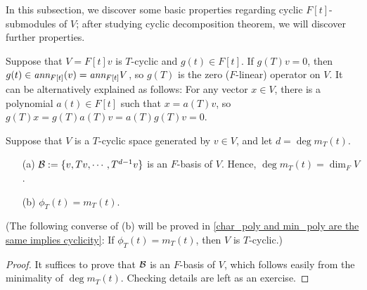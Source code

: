 In this subsection, we discover some basic properties regarding cyclic $F[t]$-submodules of $V$; after studying cyclic decomposition theorem, we will discover further properties.
\begin{exmp}
    Suppose that $V=F[t]v$ is $T$-cyclic and $g(t)\in F[t]$.
    If $g(T)v=0$, then $g(t)\in\textit{ann}_{F[t]}(v)=\textit{ann}_{F[t]} V$, so $g(T)$ is the zero ($F$-linear) operator on $V$.
    It can be alternatively explained as follows: For any vector $x\in V$, there is a polynomial $a(t)\in F[t]$ such that $x=a(T)v$, so $g(T)x=g(T)a(T)v=a(T)g(T)v=0$.
\end{exmp}

\begin{lem}\label{T-cyclic basic}
    Suppose that $V$ is a $T$-cyclic space generated by $v\in V$, and let $d=\deg m_T(t)$.
    \begin{enumerate}
        \item[(a)]
        {
            ${\mathcal{B}}:=\{v, Tv, \cdots, T^{d-1}v\}$ is an $F$-basis of $V$.
            Hence, $\deg m_T(t)=\dim_F V$.
        }
        \item[(b)]
        {
            $\phi_T(t)=m_T(t)$.
        }
    \end{enumerate}
    (The following converse of (b) will be proved in \cref{char_poly and min_poly are the same implies cyclicity}: If $\phi_T(t)=m_T(t)$, then $V$ is $T$-cyclic.)
\end{lem}
\begin{proof}
    It suffices to prove that ${\mathcal{B}}$ is an $F$-basis of $V$, which follows easily from the minimality of $\deg m_T(t)$.
    \color{brown}Checking details are left as an exercise.\color{black}
\end{proof}

